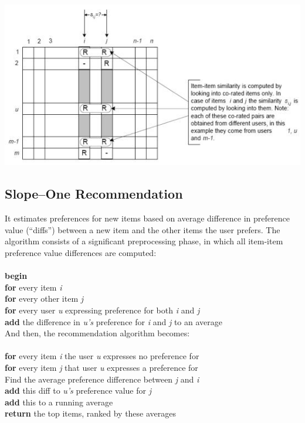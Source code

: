 \documentclass{article}
\begin{document}
\includegraphics[width=15cm]{image.jpg}

\subsection{Slope–One Recommendation}
It estimates preferences for new items based on average difference in preference value (“diffs”) between a new item and the other items the user prefers. The algorithm consists of a significant preprocessing phase, in which all item-item preference value differences are computed:\\ \\
\textbf{begin}\\
\textbf{for} every item \emph{i}\\
\textbf{for} every other item \emph{j}\\
\textbf{for} every user \emph{u} expressing preference for both \emph{i} and \emph{j}\\
\textbf{add} the difference in \emph{u’s} preference for \emph{i} and \emph{j} to an average\\

And then, the recommendation algorithm becomes:\\ \\
\textbf{for} every item \emph{i} the user \emph{u} expresses no preference for\\
\textbf{for} every item \emph{j} that user \emph{u} expresses a preference for\\
Find the average preference difference between \emph{j} and \emph{i}\\
\textbf{add} this diff to \emph{u’s} preference value for \emph{j}\\
\textbf{add} this to a running average\\
\textbf{return} the top items, ranked by these averages \\
\end{document}
